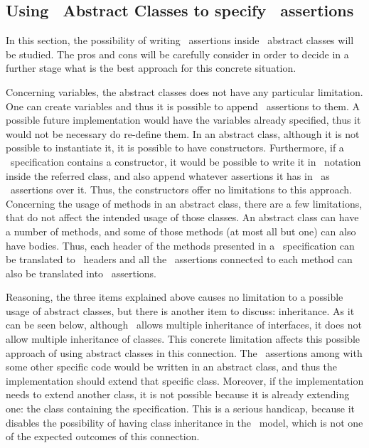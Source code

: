 \subsection{Using \java\ Abstract Classes to specify \jml\ assertions}

In this section, the possibility of writing \jml\ assertions inside \java\ abstract classes will be studied. The pros and cons will be carefully consider in order to decide in a further stage what is the best approach for this concrete situation.

Concerning variables, the abstract classes does not have any particular limitation. One can create variables and thus it is possible to append \jml\ assertions to them. A possible future implementation would have the variables already specified, thus it would not be necessary do re-define them. 
In an abstract class, although it is not possible to instantiate it, it is possible to have constructors. Furthermore, if a \vpp\ specification contains a constructor, it would be possible to write it in \java\ notation inside the referred class, and also append whatever assertions it has in \vpp\ as \jml\ assertions over it. Thus, the constructors offer no limitations to this approach.
Concerning the usage of methods in an abstract class, there are a few limitations, that do not affect the intended usage of those classes. An abstract class can have a number of methods, and some of those methods (at most all but one) can also have bodies. Thus, each header of the methods presented in a \vpp\ specification can be translated to \java\ headers and all the \vpp\ assertions connected to each method can also be translated into \jml\ assertions.

Reasoning, the three items explained above causes no limitation to a possible usage of abstract classes, but there is another item to discuss: inheritance. 
As it can be seen below, although \java\ allows multiple inheritance of interfaces, it does not allow multiple inheritance of classes. This concrete limitation affects this possible approach of using abstract classes in this connection. 
The \jml\ assertions among with some other specific code would be written in an abstract class, and thus the implementation should extend that specific class. Moreover, if the implementation needs to extend another class, it is not possible because it is already extending one: the class containing the specification. 
This is a serious handicap, because it disables the possibility of having class inheritance in the \vpp\ model, which is not one of the expected outcomes of this connection.

